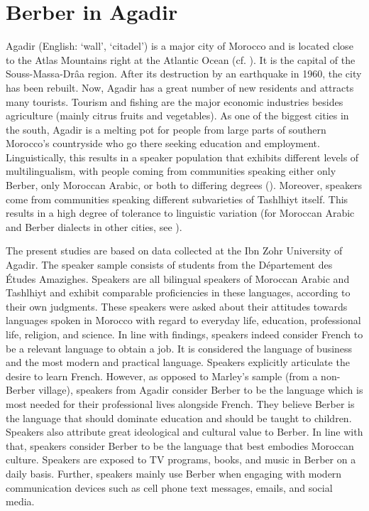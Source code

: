 \section{Berber in Agadir}\label{sec:3.3}
Agadir (English: ‘wall’, ‘citadel’) is a major city of Morocco and is located close to the Atlas Mountains right at the Atlantic Ocean (cf. ). It is the capital of the Souss-Massa-Drâa region. After its destruction by an earthquake in 1960, the city has been rebuilt. Now, Agadir has a great number of new residents and attracts many tourists. Tourism and fishing are the major economic industries besides agriculture (mainly citrus fruits and vegetables). As one of the biggest cities in the south, Agadir is a melting pot for people from large parts of southern Morocco’s countryside who go there seeking education and employment. Linguistically, this results in a speaker population that exhibits different levels of multilingualism, with people coming from communities speaking either only Berber, only Moroccan Arabic, or both to differing degrees (\citealt{Mountassir2008}). Moreover, speakers come from communities speaking different subvarieties of Tashlhiyt itself. This results in a high degree of tolerance to linguistic variation (for Moroccan Arabic and Berber dialects in other cities, see \citealt{MaasProch2012}).

The present studies are based on data collected at the Ibn Zohr University of Agadir. The speaker sample consists of students from the Département des Études Amazighes. Speakers are all bilingual speakers of Moroccan Arabic and Tashlhiyt and exhibit comparable proficiencies in these languages, according to their own judgments. These speakers were asked about their attitudes towards languages spoken in Morocco with regard to everyday life, education, professional life, religion, and science. In line with  findings, speakers indeed consider French to be a relevant language to obtain a job. It is considered the language of business and the most modern and practical language. Speakers explicitly articulate the desire to learn French. However, as opposed to Marley’s sample (from a non-Berber village), speakers from Agadir consider Berber to be the language which is most needed for their professional lives alongside French. They believe Berber is the language that should dominate education and should be taught to children. Speakers also attribute great ideological and cultural value to Berber. In line with that, speakers consider Berber to be the language that best embodies Moroccan culture. Speakers are exposed to TV programs, books, and music in Berber on a daily basis. Further, speakers mainly use Berber when engaging with modern communication devices such as cell phone text messages, emails, and social media. 

